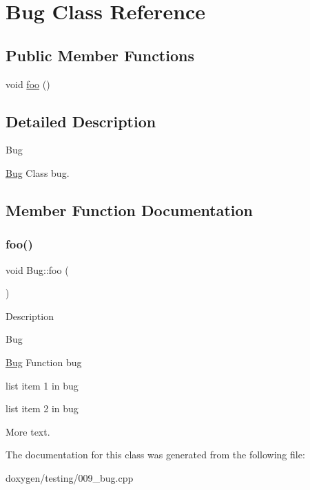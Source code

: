 \hypertarget{class_bug}{}\section{Bug Class Reference}
\label{class_bug}
\subsection*{Public Member Functions}
\begin{DoxyCompactItemize}
\item 
void \mbox{\hyperlink{class_bug_a1f720954dd97cd1203e80501a6eae74c}{foo}} ()
\end{DoxyCompactItemize}


\subsection{Detailed Description}
\begin{DoxyRefDesc}{Bug}
\item[\mbox{\hyperlink{bug__bug000004}{Bug}}]Class bug. \end{DoxyRefDesc}


\subsection{Member Function Documentation}
\mbox{\label{class_bug_a1f720954dd97cd1203e80501a6eae74c}} 
\subsubsection{\texorpdfstring{foo()}{foo()}}
{\footnotesize\ttfamily void Bug\+::foo (\begin{DoxyParamCaption}{ }\end{DoxyParamCaption})}

Description \begin{DoxyRefDesc}{Bug}
\item[\mbox{\hyperlink{bug__bug000005}{Bug}}]Function bug
\begin{DoxyItemize}
\item list item 1 in bug
\item list item 2 in bug
\end{DoxyItemize}\end{DoxyRefDesc}


More text. 

The documentation for this class was generated from the following file\+:\begin{DoxyCompactItemize}
\item 
doxygen/testing/009\+\_\+bug.\+cpp\end{DoxyCompactItemize}
